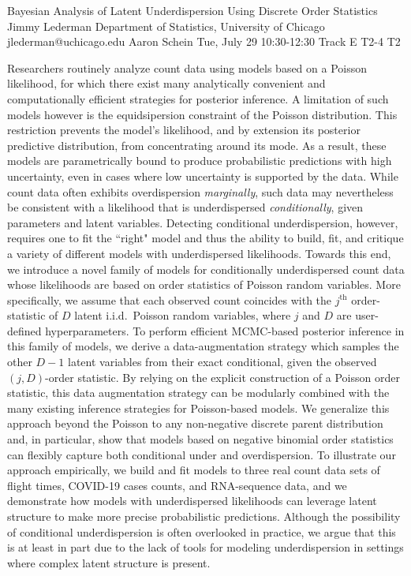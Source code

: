 \begin{talk}
  {Bayesian Analysis of Latent Underdispersion Using Discrete Order Statistics}%
  {Jimmy Lederman}%
  {Department of Statistics, University of Chicago}%
  {jlederman@uchicago.edu}%
  {Aaron Schein}%
  {}%
  {Tue, July 29 10:30-12:30 Track E}%
  {T2-4}%
  {T2}%


Researchers routinely analyze count data using models based on a Poisson likelihood, for which there exist many analytically convenient and computationally efficient strategies for posterior inference. A limitation of such models however is the equidsipersion constraint of the Poisson distribution. This restriction prevents the model's likelihood, and by extension its posterior predictive distribution, from concentrating around its mode. As a result, these models are parametrically bound to produce probabilistic predictions with high uncertainty, even in cases where low uncertainty is supported by the data. While count data often exhibits overdispersion \textit{marginally}, such data may nevertheless be consistent with a likelihood that is underdispersed \textit{conditionally}, given parameters and latent variables. Detecting conditional underdispersion, however, requires one to fit the ``right" model and thus the ability to build, fit, and critique a variety of different models with underdispersed likelihoods. Towards this end, we introduce a novel family of models for conditionally underdispersed count data whose likelihoods are based on order statistics of Poisson random variables. More specifically, we assume that each observed count coincides with the $j^{\textrm{th}}$ order-statistic of $D$ latent i.i.d.~Poisson random variables, where $j$ and $D$ are user-defined hyperparameters. To perform efficient MCMC-based posterior inference in this family of models, we derive a data-augmentation strategy which samples the other $D{-}1$ latent variables from their exact conditional, given the observed $(j,D)$-order statistic. By relying on the explicit construction of a Poisson order statistic, this data augmentation strategy can be modularly combined with the many existing inference strategies for Poisson-based models. We generalize this approach beyond the Poisson to any non-negative discrete parent distribution and, in particular, show that models based on negative binomial order statistics can flexibly capture both conditional under and overdispersion.  To illustrate our approach empirically, we build and fit models to three real count data sets of flight times, COVID-19 cases counts, and RNA-sequence data, and we demonstrate how models with underdispersed likelihoods can leverage latent structure to make more precise probabilistic predictions. Although the possibility of conditional underdispersion is often overlooked in practice, we argue that this is at least in part due to the lack of tools for modeling underdispersion in settings where complex latent structure is present.


\end{talk}
